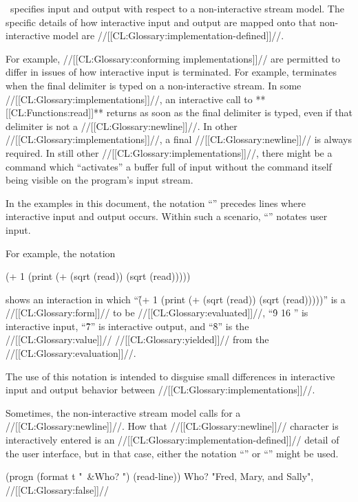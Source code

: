 \itemitem{{\OUT}}

\clisp\ specifies input and output with respect to a non-interactive stream model. The specific details of how interactive input and output are mapped onto that non-interactive model are //[[CL:Glossary:implementation-defined]]//.

For example, //[[CL:Glossary:conforming implementations]]// are permitted to differ in issues  of how interactive input is terminated.  For example,  terminates when the final delimiter is typed on a non-interactive stream. In some //[[CL:Glossary:implementations]]//, an interactive call to **[[CL:Functions:read]]** returns as soon as the final delimiter is typed, even if that delimiter is not a //[[CL:Glossary:newline]]//. In other //[[CL:Glossary:implementations]]//, a final //[[CL:Glossary:newline]]// is always required. In still other //[[CL:Glossary:implementations]]//, there might be a command which ``activates'' a buffer full of input without the command itself being visible on the program's input stream.

In the examples in this document, the notation ``{\OUT}'' precedes  lines where interactive input and output occurs.  Within such a scenario, ``'' notates user input.

For example, the notation

\code
 (+ 1 (print (+ (sqrt (read)) (sqrt (read))))) \OUT {}   \endcode

shows an interaction in which
  ``\f{(+ 1 (print (+ (sqrt (read)) (sqrt (read)))))}''
    is a //[[CL:Glossary:form]]// to be //[[CL:Glossary:evaluated]]//,
  ``\f{9 16 }'' is interactive input,
  ``\f{7}'' is interactive output, and 
  ``\f{8}'' is the //[[CL:Glossary:value]]// //[[CL:Glossary:yielded]]// from the //[[CL:Glossary:evaluation]]//.

The use of this notation is intended to disguise small differences  in interactive input and output behavior between //[[CL:Glossary:implementations]]//.

Sometimes, the non-interactive stream model calls for a //[[CL:Glossary:newline]]//. How that //[[CL:Glossary:newline]]// character is interactively entered is an  //[[CL:Glossary:implementation-defined]]// detail of the user interface, but in that case, either the notation ``\NewlineChar'' or ``\CRLF'' might be used.

\code
 (progn (format t "~&Who? ") (read-line)) \OUT Who?  \EV "Fred, Mary, and Sally", //[[CL:Glossary:false]]// \endcode

